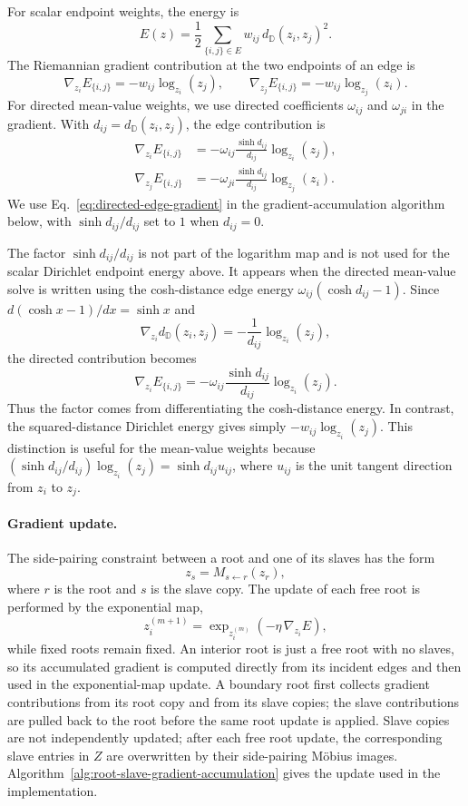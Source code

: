 \documentclass[12pt]{article}
\newcommand{\D}{\mathbb D}
\theoremstyle{definition}
\theoremstyle{remark}
\numberwithin{equation}{section}
\begin{document}
For scalar endpoint weights, the energy is
\[
E(z)=\frac12\sum_{\{i,j\}\in E} w_{ij}\,d_{\D}(z_i,z_j)^2.
\]
The Riemannian gradient contribution at the two endpoints of an edge is
\[
\nabla_{z_i}E_{\{i,j\}}=-w_{ij}\log_{z_i}(z_j), \qquad \nabla_{z_j}E_{\{i,j\}}=-w_{ij}\log_{z_j}(z_i).
\]
For directed mean-value weights, we use directed coefficients $\omega_{ij}$ and $\omega_{ji}$ in the gradient. With $d_{ij}=d_{\D}(z_i,z_j)$, the edge contribution is
\begin{equation}
\label{eq:directed-edge-gradient}
\begin{aligned}
\nabla_{z_i}E_{\{i,j\}} &= -\omega_{ij}\frac{\sinh d_{ij}}{d_{ij}}\log_{z_i}(z_j), \\
\nabla_{z_j}E_{\{i,j\}} &= -\omega_{ji}\frac{\sinh d_{ij}}{d_{ij}}\log_{z_j}(z_i).
\end{aligned}
\end{equation}
We use Eq.~\eqref{eq:directed-edge-gradient} in the gradient-accumulation algorithm below, with $\sinh d_{ij}/d_{ij}$ set to $1$ when $d_{ij}=0$.

The factor $\sinh d_{ij}/d_{ij}$ is not part of the logarithm map and is not used for the scalar Dirichlet endpoint energy above. It appears when the directed mean-value solve is written using the cosh-distance edge energy $\omega_{ij}(\cosh d_{ij}-1)$. Since $d(\cosh x-1)/d x=\sinh x$ and
\[
\nabla_{z_i} d_{\D}(z_i,z_j) = -\frac{1}{d_{ij}}\log_{z_i}(z_j),
\]
the directed contribution becomes
\[
\nabla_{z_i}E_{\{i,j\}} = -\omega_{ij} \frac{\sinh d_{ij}}{d_{ij}} \log_{z_i}(z_j).
\]
Thus the factor comes from differentiating the cosh-distance energy. In contrast, the squared-distance Dirichlet energy gives simply $-w_{ij}\log_{z_i}(z_j)$. This distinction is useful for the mean-value weights because $(\sinh d_{ij}/d_{ij})\log_{z_i}(z_j)=\sinh d_{ij}u_{ij}$, where $u_{ij}$ is the unit tangent direction from $z_i$ to $z_j$.

\paragraph{Gradient update.}
The side-pairing constraint between a root and one of its slaves has the form
\[
z_s=M_{s\leftarrow r}(z_r),
\]
where $r$ is the root and $s$ is the slave copy. The update of each free root is performed by the exponential map,
\[
z_i^{(m+1)} = \exp_{z_i^{(m)}}\left(-\eta\,\nabla_{z_i}E\right),
\]
while fixed roots remain fixed. An interior root is just a free root with no slaves, so its accumulated gradient is computed directly from its incident edges and then used in the exponential-map update. A boundary root first collects gradient contributions from its root copy and from its slave copies; the slave contributions are pulled back to the root before the same root update is applied. Slave copies are not independently updated; after each free root update, the corresponding slave entries in $Z$ are overwritten by their side-pairing Möbius images. Algorithm~\ref{alg:root-slave-gradient-accumulation} gives the update used in the implementation.
\end{document}
